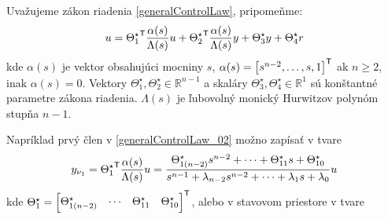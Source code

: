 \documentclass[a4paper, 10pt, ]{article}
\begin{document}
Uvažujeme zákon riadenia \eqref{generalControlLaw}, pripomeňme:
\begin{equation} \label{generalControlLaw_02}
	u = {\Theta_1^\star}^{\mathsf{T}} \frac{\alpha(s)}{\Lambda(s)} u + {\Theta_2^\star}^{\mathsf{T}} \frac{\alpha(s)}{\Lambda(s)} y + \Theta_3^\star y + \Theta_4^\star r
\end{equation}
kde $\alpha(s)$ je vektor obsahujúci mocniny $s$, $\alpha(s) = \begin{bmatrix} s^{n-2}, \ldots, s, 1 \end{bmatrix}^{\mathsf{T}}$ ak $n\geq 2$, inak $\alpha(s) = 0$. Vektory ${\Theta_1^\star}, \Theta_2^\star \in \mathbb{R}^{n-1}$ a skaláry $\Theta_3^\star, \Theta_4^\star \in \mathbb{R}^1$ sú konštantné parametre zákona riadenia. $\Lambda(s)$ je ľubovolný monický Hurwitzov polynóm stupňa $n-1$.

Napríklad prvý člen v \eqref{generalControlLaw_02} možno zapísať v tvare
\begin{equation}
	y_{\nu_1} = {\Theta_1^\star}^{\mathsf{T}} \frac{\alpha(s)}{\Lambda(s)} u
    =
	\frac{
	\Theta_{1(n-2)}^\star s^{n-2}    + \cdots + \Theta_{11}^\star s + \Theta_{10}^\star
	}{
	s^{n-1}+ \lambda_{n-2} s^{n-2} + \cdots + \lambda_1 s + \lambda_0
	}
	u
\end{equation}
kde $ \Theta_1^\star = \begin{bmatrix} \Theta_{1(n-2)}^\star  & \cdots & \Theta_{11}^\star & \Theta_{10}^\star \end{bmatrix}^{\mathsf{T}} $, alebo v stavovom priestore v tvare
\end{document}
